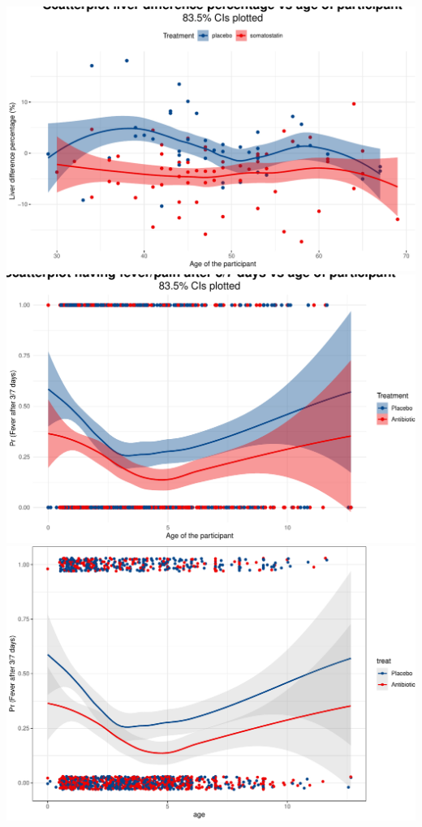 \documentclass[14pt,]{article}
\begin{document}
\includegraphics{Figs/unnamed-chunk-5-1.pdf}
\includegraphics{Figs/unnamed-chunk-5-2.pdf}
\includegraphics{Figs/unnamed-chunk-5-3.pdf}
\end{document}

